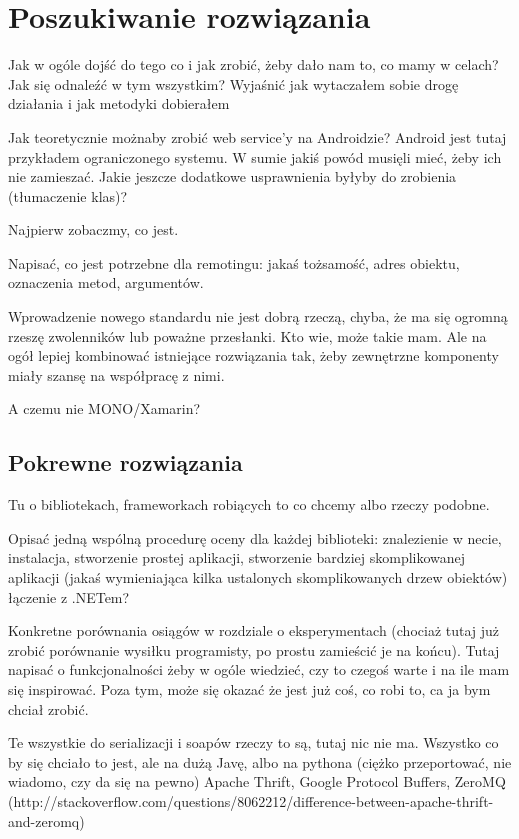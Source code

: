 \chapter{Poszukiwanie rozwiązania}
Jak w ogóle dojść do tego  co i jak zrobić, żeby dało nam to, co mamy w celach? Jak się odnaleźć w tym wszystkim?
Wyjaśnić jak wytaczałem sobie drogę działania i jak metodyki dobierałem

Jak teoretycznie możnaby zrobić web service'y na Androidzie? Android jest tutaj przykładem ograniczonego systemu.
W sumie jakiś powód musięli mieć, żeby ich nie zamieszać. Jakie jeszcze dodatkowe usprawnienia byłyby do zrobienia (tłumaczenie klas)?

Najpierw zobaczmy, co jest.

Napisać, co jest potrzebne dla remotingu: jakaś tożsamość, adres obiektu, oznaczenia metod, argumentów.

Wprowadzenie nowego standardu nie jest dobrą rzeczą, chyba, że ma się ogromną rzeszę zwolenników lub poważne przesłanki. Kto wie, może takie mam. Ale na ogół lepiej kombinować istniejące rozwiązania tak, żeby zewnętrzne komponenty miały szansę na współpracę z nimi.

A czemu nie MONO/Xamarin?
\section{Pokrewne rozwiązania}
\label{existing_frameworks}
Tu o bibliotekach, frameworkach robiących to co chcemy albo rzeczy podobne.

Opisać jedną wspólną procedurę oceny dla każdej biblioteki: znalezienie w necie, instalacja, stworzenie prostej aplikacji, stworzenie bardziej skomplikowanej aplikacji (jakaś wymieniająca kilka ustalonych skomplikowanych drzew obiektów) łączenie z .NETem?

Konkretne porównania osiągów w rozdziale o eksperymentach (chociaż tutaj już zrobić porównanie wysiłku programisty, po prostu zamieścić je na końcu). Tutaj napisać o funkcjonalności żeby w ogóle wiedzieć, czy to czegoś warte i na ile mam się inspirować. Poza tym, może się okazać że jest już coś, co robi to, ca ja bym chciał zrobić.

Te wszystkie do serializacji i soapów rzeczy to są, tutaj nic nie ma. Wszystko co by się chciało to jest, ale na dużą Javę, albo na pythona (ciężko przeportować, nie wiadomo, czy da się na pewno) Apache Thrift, Google Protocol Buffers, ZeroMQ (http://stackoverflow.com/questions/8062212/difference-between-apache-thrift-and-zeromq)


